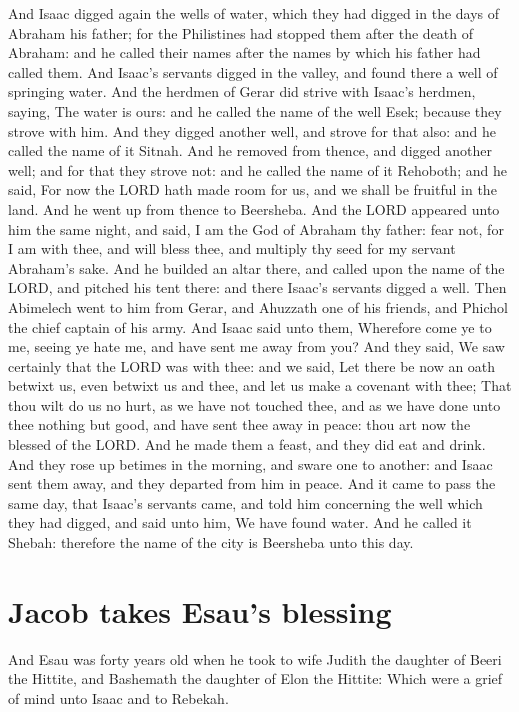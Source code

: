 \begin{biblechapter}
\verse And Isaac digged again the wells of water, which they had digged in the days of Abraham his father; for the Philistines had stopped them after the death of Abraham: and he called their names after the names by which his father had called them.
\verse And Isaac's servants digged in the valley, and found there a well of springing water.
\verse And the herdmen of Gerar did strive with Isaac's herdmen, saying, The water is ours: and he called the name of the well Esek; because they strove with him.
\verse And they digged another well, and strove for that also: and he called the name of it Sitnah.
\verse And he removed from thence, and digged another well; and for that they strove not: and he called the name of it Rehoboth; and he said, For now the LORD hath made room for us, and we shall be fruitful in the land.
\verse And he went up from thence to Beersheba.
\verse And the LORD appeared unto him the same night, and said, I am the God of Abraham thy father: fear not, for I am with thee, and will bless thee, and multiply thy seed for my servant Abraham's sake.
\verse And he builded an altar there, and called upon the name of the LORD, and pitched his tent there: and there Isaac's servants digged a well.
\verse Then Abimelech went to him from Gerar, and Ahuzzath one of his friends, and Phichol the chief captain of his army.
\verse And Isaac said unto them, Wherefore come ye to me, seeing ye hate me, and have sent me away from you?
\verse And they said, We saw certainly that the LORD was with thee: and we said, Let there be now an oath betwixt us, even betwixt us and thee, and let us make a covenant with thee;
\verse That thou wilt do us no hurt, as we have not touched thee, and as we have done unto thee nothing but good, and have sent thee away in peace: thou art now the blessed of the LORD.
\verse And he made them a feast, and they did eat and drink.
\verse And they rose up betimes in the morning, and sware one to another: and Isaac sent them away, and they departed from him in peace.
\verse And it came to pass the same day, that Isaac's servants came, and told him concerning the well which they had digged, and said unto him, We have found water.
\verse And he called it Shebah: therefore the name of the city is Beersheba unto this day.
\section*{Jacob takes Esau's blessing}
\verse And Esau was forty years old when he took to wife Judith the daughter of Beeri the Hittite, and Bashemath the daughter of Elon the Hittite:
\verse Which were a grief of mind unto Isaac and to Rebekah.
\end{biblechapter}

